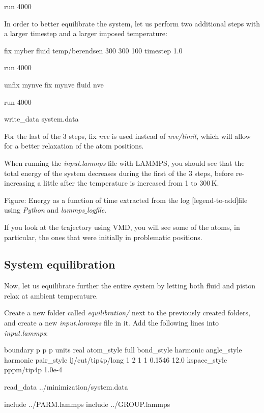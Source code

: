 \begin{lcverbatim}
run 4000
\end{lcverbatim}

\noindent In order to better equilibrate the system, let us perform 
two additional steps with a larger timestep and a larger
imposed temperature:

\begin{lcverbatim}
fix myber fluid temp/berendsen 300 300 100
timestep 1.0

run 4000

unfix mynve
fix mynve fluid nve

run 4000

write_data system.data
\end{lcverbatim}

\noindent For the last of the 3 steps, fix \textit{nve} is used instead of 
\textit{nve/limit}, which will allow for a better relaxation of the 
atom positions.

\vspace{0.25cm} \noindent When running the \textit{input.lammps} file with LAMMPS, you should see that
the total energy of the system decreases during the first 
of the 3 steps, before re-increasing a little after the 
temperature is increased from 1 to $300\,\text{K}$.

\vspace{0.25cm} Figure: Energy as a function of time extracted from the log
[legend-to-add]file using \textit{Python} and \textit{lammps$\_$logfile}.

\vspace{0.25cm} \noindent If you look at the trajectory using VMD, you will see some
of the atoms, in particular, the ones that were
initially in problematic positions. 

\subsection{System equilibration}
\noindent Now, let us equilibrate further the entire system by letting both
fluid and piston relax at ambient temperature.

\vspace{0.25cm} \noindent Create a new folder called \textit{equilibration/} next to 
the previously created folders, and create a new
\textit{input.lammps} file in it. Add the following lines into \textit{input.lammps}:

\begin{lcverbatim}
boundary p p p
units real
atom_style full
bond_style harmonic
angle_style harmonic
pair_style lj/cut/tip4p/long 1 2 1 1 0.1546 12.0
kspace_style pppm/tip4p 1.0e-4

read_data ../minimization/system.data

include ../PARM.lammps
include ../GROUP.lammps
\end{lcverbatim}

